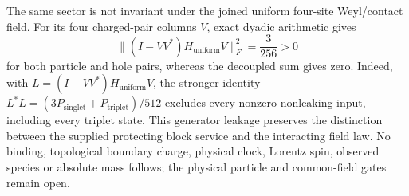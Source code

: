 The same sector is not invariant under the joined uniform four-site
Weyl/contact field.  For its four charged-pair columns $V$, exact dyadic
arithmetic gives
\[
 \|(I-VV^*)H_{\mathrm{uniform}}V\|_F^2=\frac3{256}>0
\]
for both particle and hole pairs, whereas the decoupled sum gives zero.
Indeed, with $L=(I-VV^*)H_{\mathrm{uniform}}V$, the stronger identity
$L^*L=(3P_{\mathrm{singlet}}+P_{\mathrm{triplet}})/512$ excludes every
nonzero nonleaking input, including every triplet state.
This generator leakage preserves the distinction between the supplied
protecting block service and the interacting field law.  No binding,
topological boundary charge, physical clock, Lorentz spin, observed species
or absolute mass follows; the physical particle and common-field gates
remain open.

